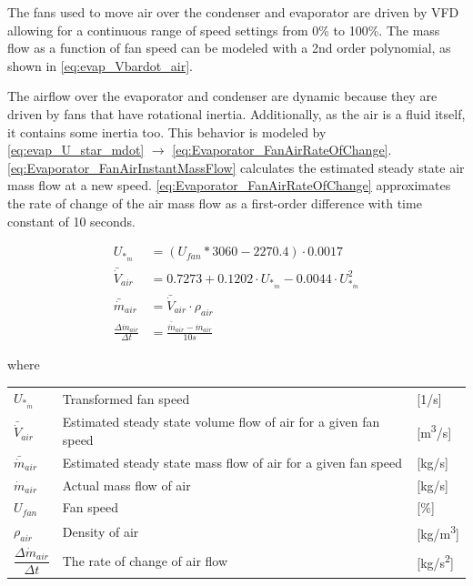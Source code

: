 The fans used to move air over the condenser and evaporator are driven by VFD allowing for a continuous range of speed settings from 0\% to 100\%. The mass flow as a function of fan speed can be modeled with a 2nd order polynomial, as shown in \cref{eq:evap_Vbardot_air}.

The airflow over the evaporator and condenser are dynamic because they are driven by fans that have rotational inertia. Additionally, as the air is a fluid itself, it contains some inertia too. This behavior is modeled by \cref{eq:evap_U_star_mdot} $\rightarrow$ \cref{eq:Evaporator_FanAirRateOfChange}. \cref{eq:Evaporator_FanAirInstantMassFlow} calculates the estimated steady state air mass flow at a new speed. \cref{eq:Evaporator_FanAirRateOfChange} approximates the rate of change of the air mass flow as a first-order difference with time constant of 10 seconds.

\begin{align}
	U_{*_{\dot{m}}} & = (U_{fan}*3060 - 2270.4)\cdot 0.0017 \label{eq:evap_U_star_mdot}\\
	\bar{\dot{V}}_{air} & = 0.7273 + 0.1202 \cdot 	U_{*_{\dot{m}}}  -0.0044 \cdot 	U_{*_{\dot{m}}}^2	\label{eq:evap_Vbardot_air} \\
	\bar{\dot{m}}_{air} & = \bar{\dot{V}}_{air} \cdot \rho_{air}	\label{eq:Evaporator_FanAirInstantMassFlow} \\
	\frac{\Delta \dot{m}_{air}}{\Delta t} & = \frac{\bar{\dot{m}}_{air}  - \dot{m}_{air}} {10s}	\label{eq:Evaporator_FanAirRateOfChange}
\end{align}

where

\begin{center}
	\begin{tabular}{l p{8cm} l}
		$ 	U_{*_{\dot{m}}} $ 						& Transformed fan speed												& [1/\si{s}]\\
		$\bar{\dot{V}}_{air}$						& Estimated steady state volume flow of air for a given fan speed 	& [\si{m^3}/\si{s}] \\
		$\bar{\dot{m}}_{air}$						& Estimated steady state mass flow of air for a given fan speed 	& [\si{kg}/\si{s}] \\
		$\dot{m}_{air}$								& Actual mass flow of air					  						& [\si{kg}/\si{s}] \\
		$U_{fan}$									& Fan speed 														& [$\%$] \\
		$\rho_{air}$								& Density of air													& [\si{kg}/\si{m^3}] \\[0.2cm]
		$\dfrac{\Delta \dot{m}_{air}}{\Delta t} $ 	& The rate of change of	air flow 									& [\si{kg}/\si{s^2}]
	\end{tabular}
\end{center}

